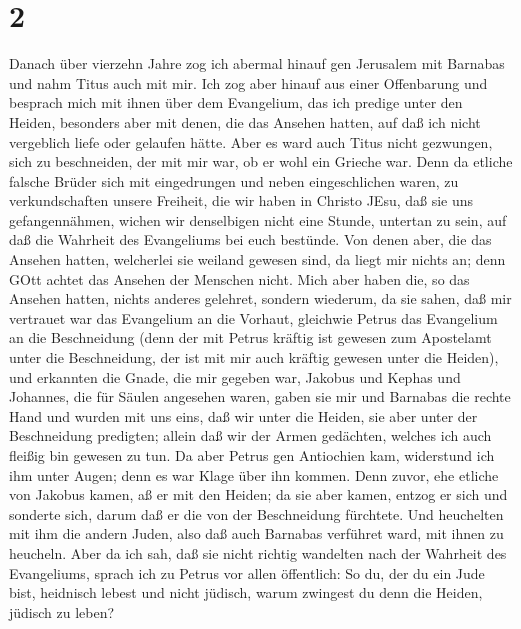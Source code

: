\hypertarget{section-1}{%
\section{2}\label{section-1}}

 Danach über vierzehn Jahre zog ich abermal hinauf gen
Jerusalem mit Barnabas und nahm Titus auch mit mir.  Ich zog
aber hinauf aus einer Offenbarung und besprach mich mit ihnen über dem
Evangelium, das ich predige unter den Heiden, besonders aber mit denen,
die das Ansehen hatten, auf daß ich nicht vergeblich liefe oder gelaufen
hätte.  Aber es ward auch Titus nicht gezwungen, sich zu
beschneiden, der mit mir war, ob er wohl ein Grieche war. 
Denn da etliche falsche Brüder sich mit eingedrungen und neben
eingeschlichen waren, zu verkundschaften unsere Freiheit, die wir haben
in Christo JEsu, daß sie uns gefangennähmen,  wichen wir
denselbigen nicht eine Stunde, untertan zu sein, auf daß die Wahrheit
des Evangeliums bei euch bestünde.  Von denen aber, die das
Ansehen hatten, welcherlei sie weiland gewesen sind, da liegt mir nichts
an; denn GOtt achtet das Ansehen der Menschen nicht. Mich aber haben
die, so das Ansehen hatten, nichts anderes gelehret, 
sondern wiederum, da sie sahen, daß mir vertrauet war das Evangelium an
die Vorhaut, gleichwie Petrus das Evangelium an die Beschneidung
 (denn der mit Petrus kräftig ist gewesen zum Apostelamt
unter die Beschneidung, der ist mit mir auch kräftig gewesen unter die
Heiden),  und erkannten die Gnade, die mir gegeben war,
Jakobus und Kephas und Johannes, die für Säulen angesehen waren, gaben
sie mir und Barnabas die rechte Hand und wurden mit uns eins, daß wir
unter die Heiden, sie aber unter der Beschneidung predigten;
 allein daß wir der Armen gedächten, welches ich auch
fleißig bin gewesen zu tun.  Da aber Petrus gen Antiochien
kam, widerstund ich ihm unter Augen; denn es war Klage über ihn kommen.
 Denn zuvor, ehe etliche von Jakobus kamen, aß er mit den
Heiden; da sie aber kamen, entzog er sich und sonderte sich, darum daß
er die von der Beschneidung fürchtete.  Und heuchelten mit
ihm die andern Juden, also daß auch Barnabas verführet ward, mit ihnen
zu heucheln.  Aber da ich sah, daß sie nicht richtig
wandelten nach der Wahrheit des Evangeliums, sprach ich zu Petrus vor
allen öffentlich: So du, der du ein Jude bist, heidnisch lebest und
nicht jüdisch, warum zwingest du denn die Heiden, jüdisch zu leben?
